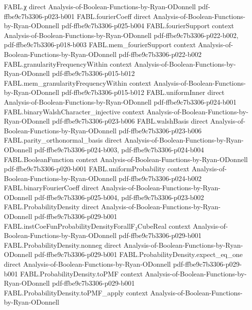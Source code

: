 \begin{theorem}
\proofstep
  {FABL.χ}
  {direct}
  {Analysis-of-Boolean-Functions-by-Ryan-ODonnell}
  {pdf-ffbe9c7b3306-p023-b001}
\proofstep
  {FABL.fourierCoeff}
  {direct}
  {Analysis-of-Boolean-Functions-by-Ryan-ODonnell}
  {pdf-ffbe9c7b3306-p025-b004}
\proofstep
  {FABL.fourierSupport}
  {context}
  {Analysis-of-Boolean-Functions-by-Ryan-ODonnell}
  {pdf-ffbe9c7b3306-p022-b002,
    pdf-ffbe9c7b3306-p018-b003}
\proofstep
  {FABL.mem_fourierSupport}
  {context}
  {Analysis-of-Boolean-Functions-by-Ryan-ODonnell}
  {pdf-ffbe9c7b3306-p022-b002}
\proofstep
  {FABL.granularityFrequencyWithin}
  {context}
  {Analysis-of-Boolean-Functions-by-Ryan-ODonnell}
  {pdf-ffbe9c7b3306-p015-b012}
\proofstep
  {FABL.mem_granularityFrequencyWithin}
  {context}
  {Analysis-of-Boolean-Functions-by-Ryan-ODonnell}
  {pdf-ffbe9c7b3306-p015-b012}
\proofstep
  {FABL.uniformInner}
  {direct}
  {Analysis-of-Boolean-Functions-by-Ryan-ODonnell}
  {pdf-ffbe9c7b3306-p024-b001}
\proofstep
  {FABL.binaryWalshCharacter_injective}
  {context}
  {Analysis-of-Boolean-Functions-by-Ryan-ODonnell}
  {pdf-ffbe9c7b3306-p023-b006}
\proofstep
  {FABL.walshBasis}
  {direct}
  {Analysis-of-Boolean-Functions-by-Ryan-ODonnell}
  {pdf-ffbe9c7b3306-p023-b006}
\proofstep
  {FABL.parity_orthonormal_basis}
  {direct}
  {Analysis-of-Boolean-Functions-by-Ryan-ODonnell}
  {pdf-ffbe9c7b3306-p024-b003,
    pdf-ffbe9c7b3306-p024-b004}
\proofstep
  {FABL.BooleanFunction}
  {context}
  {Analysis-of-Boolean-Functions-by-Ryan-ODonnell}
  {pdf-ffbe9c7b3306-p020-b001}
\proofstep
  {FABL.uniformProbability}
  {context}
  {Analysis-of-Boolean-Functions-by-Ryan-ODonnell}
  {pdf-ffbe9c7b3306-p024-b002}
\proofstep
  {FABL.binaryFourierCoeff}
  {direct}
  {Analysis-of-Boolean-Functions-by-Ryan-ODonnell}
  {pdf-ffbe9c7b3306-p025-b004,
    pdf-ffbe9c7b3306-p023-b002}
\proofstep
  {FABL.ProbabilityDensity}
  {direct}
  {Analysis-of-Boolean-Functions-by-Ryan-ODonnell}
  {pdf-ffbe9c7b3306-p029-b001}
\proofstep
  {FABL.instCoeFunProbabilityDensityForallF₂CubeReal}
  {context}
  {Analysis-of-Boolean-Functions-by-Ryan-ODonnell}
  {pdf-ffbe9c7b3306-p029-b001}
\proofstep
  {FABL.ProbabilityDensity.nonneg}
  {direct}
  {Analysis-of-Boolean-Functions-by-Ryan-ODonnell}
  {pdf-ffbe9c7b3306-p029-b001}
\proofstep
  {FABL.ProbabilityDensity.expect_eq_one}
  {direct}
  {Analysis-of-Boolean-Functions-by-Ryan-ODonnell}
  {pdf-ffbe9c7b3306-p029-b001}
\proofstep
  {FABL.ProbabilityDensity.toPMF}
  {context}
  {Analysis-of-Boolean-Functions-by-Ryan-ODonnell}
  {pdf-ffbe9c7b3306-p029-b001}
\proofstep
  {FABL.ProbabilityDensity.toPMF_apply}
  {context}
  {Analysis-of-Boolean-Functions-by-Ryan-ODonnell}

\end{theorem}
